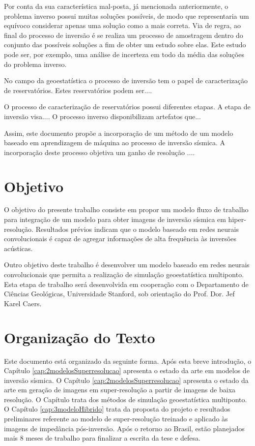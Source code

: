 Por conta da sua característica mal-posta, já mencionada anteriormente, o problema inverso
possui muitas soluções possíveis, de modo que representaria um equívoco considerar apenas
uma solução como a mais correta. Via de regra, ao final do processo de inversão é
se realiza um processo de amostragem dentro do conjunto das possíveis soluções a fim
de obter um estudo sobre elas. Este estudo pode ser, por exemplo, uma análise de 
incerteza em todo da média das soluções do problema inverso.

No campo da geoestatística o processo de inversão tem o papel de caracterização
de reservatórios. Estes reservatórios podem ser....

O processo de caracterização de reservatórios possui diferentes
etapas. A etapa de inversão visa....
O processo inverso disponibilizam artefatos que...


Assim, este documento propõe a incorporação de um método de um modelo
baseado em aprendizagem de máquina ao processo de inversão sísmica.
A incorporação deste processo objetiva um ganho de resolução ....


\section{Objetivo}

O objetivo do presente trabalho consiste em propor um modelo fluxo de trabalho
para integração de um modelo para obter imagens de inversão sísmica em hiper-resolução.
Resultados prévios indicam que o modelo baseado em redes neurais convolucionais é capaz
de agregar informações de alta frequência às inversões acústicas.

Outro objetivo deste trabalho é desenvolver um modelo baseado em redes neurais convolucionais que permita a
realização de simulação geoestatística multiponto. Esta etapa de trabalho será desenvolvida
em cooperação com o Departamento de Ciências Geológicas, Universidade Stanford, sob
orientação do Prof. Dor. Jef Karel Caers.


\section{Organização do Texto}

Este documento está organizado da seguinte forma. Após esta breve introdução, o
Capítulo \ref{cap:2modelosSuperresolucao} apresenta o estado da arte em modelos de
inversão sísmica. O Capítulo \ref{cap:2modelosSuperresolucao} apresenta o estado da arte 
em geração de imagens em super-resolução a partir de imagens de baixa resolução.
O Capítulo trata dos métodos de simulação geoestatística multiponto. O
Capítulo \ref{cap:3modeloHibrido} trata da proposta do projeto e resultados
preliminares referente ao modelo de super-resolução treinado e aplicado às imagens
de impedância pós-inversão. Após o retorno ao Brasil, estão planejados mais 8 meses
de trabalho para finalizar a escrita da tese e defesa.

